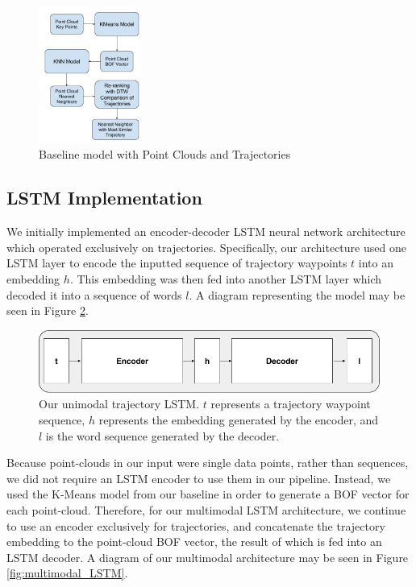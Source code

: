\documentclass[letterpaper, 12 pt, conference]{ieeeconf}
\begin{document}
\begin{figure}[htb!]
  \centering
  \includegraphics[width=0.3\textwidth]{Baseline-Point_Cloud_and_Trajectories}
  \caption{Baseline model with Point Clouds and Trajectories}
  \label{fig:Baseline_Point_Cloud_and_Trajectories}
\end{figure}

\subsection{LSTM Implementation}

We initially implemented an encoder-decoder LSTM neural network architecture which operated exclusively on trajectories. Specifically, our architecture used one LSTM layer to encode the inputted sequence of trajectory waypoints $t$ into an embedding $h$. This embedding was then fed into another LSTM layer which decoded it into a sequence of words $l$. A diagram representing the model may be seen in Figure \ref{fig:LSTM_diagram_1}.

\begin{figure}[h]
\center
\includegraphics[scale=0.3]{Trajectory_LSTM}
\caption{Our unimodal trajectory LSTM. $t$ represents a trajectory waypoint sequence, $h$ represents the embedding generated by the encoder, and $l$ is the word sequence generated by the decoder.}
\label{fig:LSTM_diagram_1}
\end{figure}

Because point-clouds in our input were single data points, rather than sequences, we did not require an LSTM encoder to use them in our pipeline. Instead, we used the K-Means model from our baseline in order to generate a BOF vector for each point-cloud. Therefore, for our multimodal LSTM architecture, we continue to use an encoder exclusively for trajectories, and concatenate the trajectory embedding to the point-cloud BOF vector, the result of which is fed into an LSTM decoder. A diagram of our multimodal architecture may be seen in Figure \ref{fig:multimodal_LSTM}.
\end{document}
